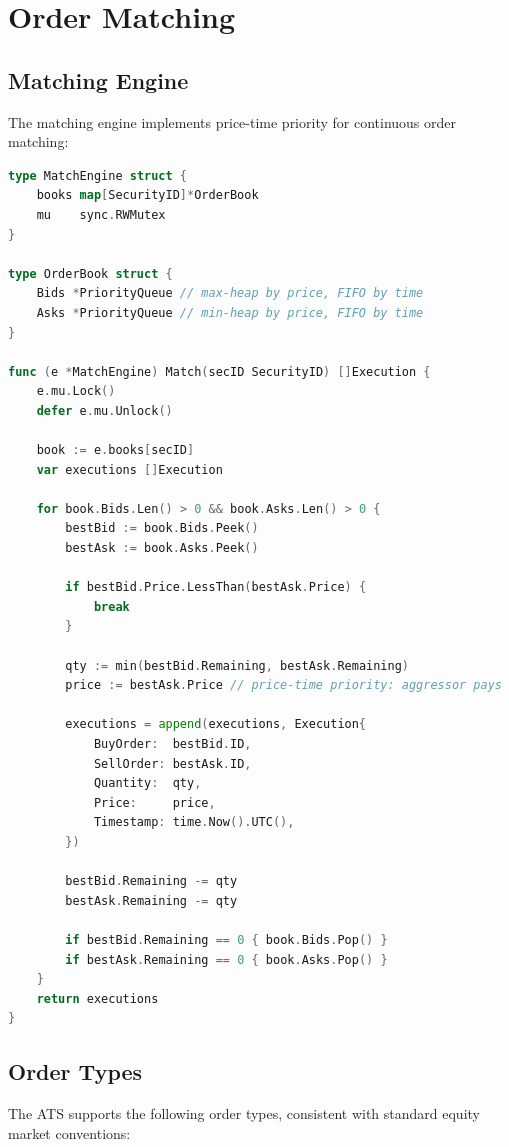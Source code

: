 \documentclass[11pt,a4paper]{article}
\begin{document}
\section{Order Matching}\label{sec:matching}

\subsection{Matching Engine}

The matching engine implements price-time priority for continuous order matching:

\begin{lstlisting}[language=Go,caption={Matching engine core.}]
type MatchEngine struct {
    books map[SecurityID]*OrderBook
    mu    sync.RWMutex
}

type OrderBook struct {
    Bids *PriorityQueue // max-heap by price, FIFO by time
    Asks *PriorityQueue // min-heap by price, FIFO by time
}

func (e *MatchEngine) Match(secID SecurityID) []Execution {
    e.mu.Lock()
    defer e.mu.Unlock()

    book := e.books[secID]
    var executions []Execution

    for book.Bids.Len() > 0 && book.Asks.Len() > 0 {
        bestBid := book.Bids.Peek()
        bestAsk := book.Asks.Peek()

        if bestBid.Price.LessThan(bestAsk.Price) {
            break
        }

        qty := min(bestBid.Remaining, bestAsk.Remaining)
        price := bestAsk.Price // price-time priority: aggressor pays

        executions = append(executions, Execution{
            BuyOrder:  bestBid.ID,
            SellOrder: bestAsk.ID,
            Quantity:  qty,
            Price:     price,
            Timestamp: time.Now().UTC(),
        })

        bestBid.Remaining -= qty
        bestAsk.Remaining -= qty

        if bestBid.Remaining == 0 { book.Bids.Pop() }
        if bestAsk.Remaining == 0 { book.Asks.Pop() }
    }
    return executions
}
\end{lstlisting}

\subsection{Order Types}

The ATS supports the following order types, consistent with standard equity market conventions:
\end{document}
